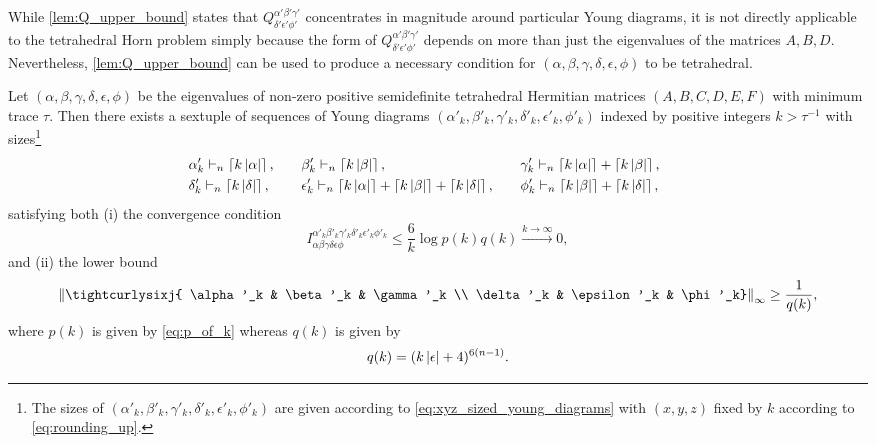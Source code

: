 \documentclass[notitlepage, 10pt]{article}
\begin{document}
While \cref{lem:Q_upper_bound} states that $Q^{\alpha'\beta'\gamma'}_{\delta'\epsilon'\phi'}$ concentrates in magnitude around particular Young diagrams, it is not directly applicable to the tetrahedral Horn problem simply because the form of $Q^{\alpha'\beta'\gamma'}_{\delta'\epsilon'\phi'}$ depends on more than just the eigenvalues of the matrices $A,B,D$. Nevertheless, \cref{lem:Q_upper_bound} can be used to produce a necessary condition for $(\alpha,\beta,\gamma,\delta,\epsilon,\phi)$ to be tetrahedral.
\begin{cor}
    \label{cor:seq_ud_recoupling_norm_lower_bound}
    Let $(\alpha,\beta,\gamma,\delta,\epsilon,\phi)$ be the eigenvalues of non-zero positive semidefinite tetrahedral Hermitian matrices $(A,B,C,D,E,F)$ with minimum trace $\tau$.
    Then there exists a sextuple of sequences of Young diagrams $(\alpha'_k, \beta'_k, \gamma'_k, \delta'_k, \epsilon'_k, \phi'_k)$ indexed by positive integers $k > \tau^{-1}$ with sizes\footnote{The sizes of $(\alpha'_k, \beta'_k, \gamma'_k, \delta'_k, \epsilon'_k, \phi'_k)$ are given according to \cref{eq:xyz_sized_young_diagrams} with $(x,y,z)$ fixed by $k$ according to \cref{eq:rounding_up}.}
    \begin{equation}
        \label{eq:ceiling_sized_young_diagrams}
        \begin{alignedat}{3}
            &\alpha'_k \vdash_{n} \left\lceil k\left|\alpha\right|\right\rceil, \qquad 
            &&\beta'_k \vdash_{n} \left\lceil k\left|\beta\right|\right\rceil, \qquad
            &&\gamma'_k \vdash_{n} \left\lceil k\left|\alpha\right|\right\rceil+\left\lceil k\left|\beta\right|\right\rceil, \qquad\\
             &\delta'_k \vdash_{n} \left\lceil k\left|\delta\right|\right\rceil, \qquad
            &&\epsilon'_k \vdash_{n} \left\lceil k\left|\alpha\right|\right\rceil+\left\lceil k\left|\beta\right|\right\rceil+\left\lceil k\left|\delta\right|\right\rceil, \qquad
            &&\phi'_k \vdash_{n} \left\lceil k\left|\beta\right|\right\rceil+\left\lceil k\left|\delta\right|\right\rceil,
        \end{alignedat}
    \end{equation}
    satisfying both (i) the convergence condition
    \begin{equation}
        \label{eq:sextuple_convergence_rate}
        I^{\alpha'_k\beta'_k\gamma'_k\delta'_k\epsilon'_k\phi'_k}_{\alpha\beta\gamma\delta\epsilon\phi} 
        \leq \frac{6}{k} \log p(k) q(k) 
        \stackrel{k\to\infty}{\longrightarrow} 0,
    \end{equation}
    and (ii) the lower bound 
    \begin{equation}
        \label{eq:seq_ud_sixj_lower_bound}
        \norm{\tightcurlysixj{ \alpha'_k & \beta'_k & \gamma'_k \\ \delta'_k &  \epsilon'_k &  \phi'_k}}_{\infty}
        \geq \frac{1}{q(k)},
    \end{equation}
    where $p(k)$ is given by \cref{eq:p_of_k} whereas $q(k)$ is given by
    \begin{equation}
        \label{eq:q_of_k}
        q(k) = (k \left|\epsilon\right|+4)^{6(n-1)}.
    \end{equation}
\end{cor}
\end{document}
